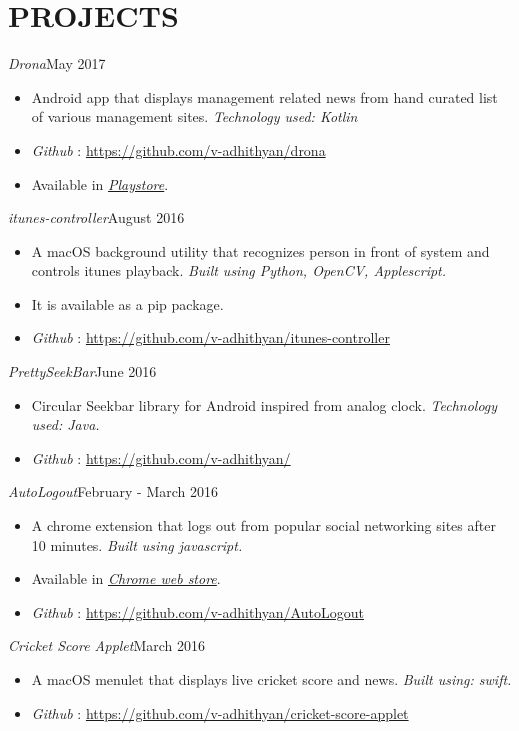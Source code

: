 \documentclass[11pt,a4paper]{article}
\begin{document}
\section*{PROJECTS}
\emph{Drona}{\hfill May 2017}
\begin{itemize}[noitemsep]
\item Android app that displays management related news from hand curated list of various management sites. \emph{Technology used: Kotlin}
\item \emph{Github} : \href{https://github.com/v-adhithyan/drona}{https://github.com/v-adhithyan/drona}
\item Available in \href{https://play.google.com/store/apps/details?id=ceg.avtechlabs.mba}{\emph{Playstore}}.
\end{itemize}
\emph{itunes-controller}{\hfill August 2016}
\begin{itemize}[noitemsep]
\item A macOS background utility that recognizes person in front of system and controls itunes playback. \emph{Built using
Python, OpenCV, Applescript.}
\item It is available as a pip package.
\item \emph{Github} : \href{https://github.com/v-adhithyan/itunes-controller}{https://github.com/v-adhithyan/itunes-controller}
\end{itemize}
\emph{PrettySeekBar}{\hfill June 2016}
\begin{itemize}[noitemsep]
\item Circular Seekbar library for Android inspired from analog clock. \emph{Technology used: Java.}
\item \emph{Github} : \href{https://github.com/v-adhithyan/PrettySeekBar}{https://github.com/v-adhithyan/}
\end{itemize}
\emph{AutoLogout}{\hfill February - March 2016}
\begin{itemize}[noitemsep]
\item A chrome extension that logs out from popular social networking sites after 10 minutes. \emph{Built using javascript.}
\item Available in \href{https://chrome.google.com/webstore/detail/auto-logout/affkccgnaoeohjnojjnpdalhpjhdiebh?hl=en}{\emph{Chrome web store}}.
\item \emph{Github} : \href{https://github.com/v-adhithyan/AutoLogout}{https://github.com/v-adhithyan/AutoLogout}
\end{itemize}
\emph{Cricket Score Applet}{\hfill March 2016}
\begin{itemize}[noitemsep]
\item A macOS menulet that displays live cricket score and news. \emph{Built using: swift.}
\item \emph{Github} : \href{https://github.com/v-adhithyan/cricket-score-applet}{https://github.com/v-adhithyan/cricket-score-applet}
\end{itemize}
\end{document}
